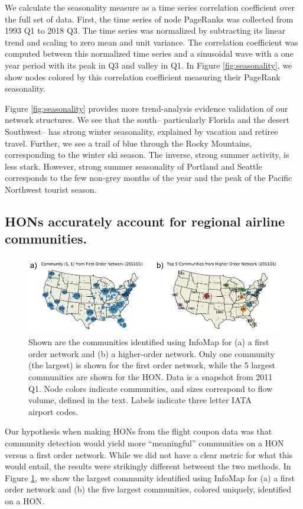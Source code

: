 \documentclass[sigconf]{acmart}
\begin{document}
We calculate the seasonality measure as a time series correlation coefficient over the full set of data. First, the time series of node PageRanks was collected from 1993 Q1 to 2018 Q3. The time series was normalized by subtracting its linear trend and scaling to zero mean and unit variance. The correlation coefficient was computed between this normalized time series and a sinusoidal wave with a one year period with its peak in Q3 and valley in Q1. In Figure \ref{fig:seasonality}, we show nodes colored by this correlation coefficient measuring their PageRank seasonality.

Figure \ref{fig:seasonality} provides more trend-analysis evidence validation of our network structures. We see that the south-- particularly Florida and the desert Southwest-- has strong winter seasonality, explained by vacation and retiree travel. Further, we see a trail of blue through the Rocky Mountains, corresponding to the winter ski season. The inverse, strong summer activity, is less stark. However, strong summer seasonality of Portland and Seattle corresponds to the few non-grey months of the year and the peak of the Pacific Northwest tourist season.

\subsection{HONs accurately account for regional airline communities.}
\begin{figure}
    \centering
    \includegraphics[width=\textwidth]{figs/FON_vs_HON.png}
    \caption{Shown are the communities identified using InfoMap for (a) a first order network and (b) a higher-order network. Only one community (the largest) is shown for the first order network, while the 5 largest communities are shown for the HON. Data is a snapshot from 2011 Q1. Node colors indicate communities, and sizes correspond to flow volume, defined in the text. Labels indicate three letter IATA airport codes.}
    \label{fig:fon-vs-hon}
\end{figure}

Our hypothesis when making HONs from the flight coupon data was that community detection would yield more ``meaningful'' communities on a HON versus a first order network. While we did not have a clear metric for what this would entail, the results were strikingly different betweent the two methods. In Figure \ref{fig:fon-vs-hon}, we show the largest community identified using InfoMap for (a) a first order network and (b) the five largest communities, colored uniquely, identified on a HON.
\end{document}
